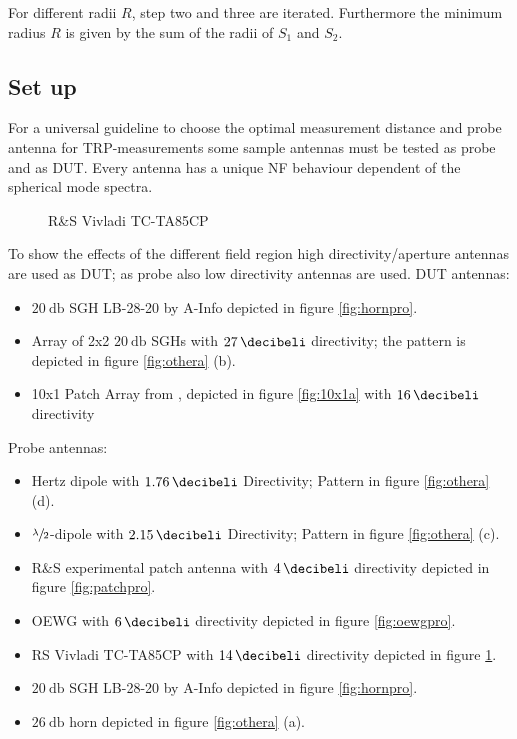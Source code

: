 For different radii $R$, step two and three are iterated. Furthermore the minimum radius $R$ is given by the sum of the radii of $S_1$ and $S_2$.

\subsection{Set up}

For a universal guideline to choose the optimal measurement distance and probe antenna for \ac{TRP}-measurements some sample antennas must be tested as probe and as \ac{DUT}. Every antenna has a unique \ac{NF} behaviour dependent of the spherical mode spectra.

\begin{figure}
  \centering
  \centering
\caption{R\&{}S Vivladi TC-TA85CP}
\label{fig:vivpro}
\end{figure}

To show the effects of the different field region high directivity/aperture antennas are used as \ac{DUT}; as probe also low directivity antennas are used. \ac{DUT} antennas:

\begin{itemize}
\item $\SI{20}{\decibel}$ \ac{SGH} LB-28-20 by A-Info depicted in figure \ref{fig:hornpro}.
\item Array of 2x2 $\SI{20}{\decibel}$ \acp{SGH} with $\SI{27}{\decibeli}$ directivity; the pattern is depicted in figure \ref{fig:othera} (b).
\item 10x1 Patch Array from \cite{7481205}, depicted in figure \ref{fig:10x1a} with $\SI{16}{\decibeli}$ directivity
\end{itemize}

Probe antennas:

\begin{itemize}
\item Hertz dipole with $\SI{1.76}{\decibeli}$ Directivity; Pattern in figure \ref{fig:othera} (d).
\item $\sfrac{\lambda}{2}$-dipole with $\SI{2.15}{\decibeli}$ Directivity; Pattern in figure \ref{fig:othera} (c).
\item R\&{}S experimental patch antenna with $\SI{4}{\decibeli}$ directivity depicted in figure \ref{fig:patchpro}.
\item \ac{OEWG} with $\SI{6}{\decibeli}$ directivity depicted in figure \ref{fig:oewgpro}.
\item \ac{RS} Vivladi TC-TA85CP with $\SI{14}{\decibeli}$ directivity depicted in figure \ref{fig:vivpro}.
\item $\SI{20}{\decibel}$ \ac{SGH} LB-28-20 by A-Info depicted in figure \ref{fig:hornpro}.
\item $\SI{26}{\decibel}$ horn depicted in figure \ref{fig:othera} (a).
\end{itemize}

